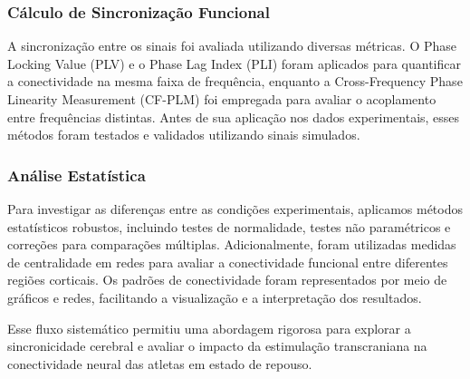 \subsubsection{Cálculo de Sincronização Funcional}
A sincronização entre os sinais foi avaliada utilizando diversas métricas. O Phase Locking Value (PLV) e o Phase Lag Index (PLI) foram aplicados para quantificar a conectividade na mesma faixa de frequência, enquanto a Cross-Frequency Phase Linearity Measurement (CF-PLM) foi empregada para avaliar o acoplamento entre frequências distintas. Antes de sua aplicação nos dados experimentais, esses métodos foram testados e validados utilizando sinais simulados.

\subsubsection{Análise Estatística} Para investigar as diferenças entre as condições experimentais, aplicamos métodos estatísticos robustos, incluindo testes de normalidade, testes não paramétricos e correções para comparações múltiplas. Adicionalmente, foram utilizadas medidas de centralidade em redes para avaliar a conectividade funcional entre diferentes regiões corticais. Os padrões de conectividade foram representados por meio de gráficos e redes, facilitando a visualização e a interpretação dos resultados.

Esse fluxo sistemático permitiu uma abordagem rigorosa para explorar a sincronicidade cerebral e avaliar o impacto da estimulação transcraniana na conectividade neural das atletas em estado de repouso.
